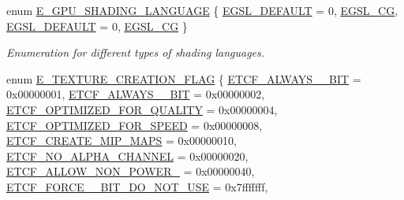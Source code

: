 \begin{DoxyCompactItemize}
\item 
enum \hyperlink{namespaceirr_1_1video_a913671e32f20f13e51336bfbe20a82a3}{E\+\_\+\+G\+P\+U\+\_\+\+S\+H\+A\+D\+I\+N\+G\+\_\+\+L\+A\+N\+G\+U\+A\+GE} \{ \hyperlink{namespaceirr_1_1video_a913671e32f20f13e51336bfbe20a82a3a3eebb0c52e3bcfee28013cfb518b4ea9}{E\+G\+S\+L\+\_\+\+D\+E\+F\+A\+U\+LT} = 0, 
\hyperlink{namespaceirr_1_1video_a913671e32f20f13e51336bfbe20a82a3a201c8a8056366df5a7f69f86ad599e01}{E\+G\+S\+L\+\_\+\+CG}, 
\hyperlink{namespaceirr_1_1video_a913671e32f20f13e51336bfbe20a82a3a3eebb0c52e3bcfee28013cfb518b4ea9}{E\+G\+S\+L\+\_\+\+D\+E\+F\+A\+U\+LT} = 0, 
\hyperlink{namespaceirr_1_1video_a913671e32f20f13e51336bfbe20a82a3a201c8a8056366df5a7f69f86ad599e01}{E\+G\+S\+L\+\_\+\+CG}
 \}\begin{DoxyCompactList}\small\item\em Enumeration for different types of shading languages. \end{DoxyCompactList}
\item 
enum \hyperlink{namespaceirr_1_1video_acaf6f7414534f7d62bff18c5bf11876f}{E\+\_\+\+T\+E\+X\+T\+U\+R\+E\+\_\+\+C\+R\+E\+A\+T\+I\+O\+N\+\_\+\+F\+L\+AG} \{ \newline
\hyperlink{namespaceirr_1_1video_acaf6f7414534f7d62bff18c5bf11876fabecb9e1d0b012d6393809a80e0041bf8}{E\+T\+C\+F\+\_\+\+A\+L\+W\+A\+Y\+S\+\_\+\_\+\+B\+IT} = 0x00000001, 
\hyperlink{namespaceirr_1_1video_acaf6f7414534f7d62bff18c5bf11876fadc16ca39b451f846d5611ac2b213620a}{E\+T\+C\+F\+\_\+\+A\+L\+W\+A\+Y\+S\+\_\+\_\+\+B\+IT} = 0x00000002, 
\hyperlink{namespaceirr_1_1video_acaf6f7414534f7d62bff18c5bf11876fa3d670628725ec4086237cbaf35b619d8}{E\+T\+C\+F\+\_\+\+O\+P\+T\+I\+M\+I\+Z\+E\+D\+\_\+\+F\+O\+R\+\_\+\+Q\+U\+A\+L\+I\+TY} = 0x00000004, 
\hyperlink{namespaceirr_1_1video_acaf6f7414534f7d62bff18c5bf11876faf43ab5c00fdf773dfeae1ed6380a662a}{E\+T\+C\+F\+\_\+\+O\+P\+T\+I\+M\+I\+Z\+E\+D\+\_\+\+F\+O\+R\+\_\+\+S\+P\+E\+ED} = 0x00000008, 
\newline
\hyperlink{namespaceirr_1_1video_acaf6f7414534f7d62bff18c5bf11876fa17c818cc743db8a0d9d991911812e4a0}{E\+T\+C\+F\+\_\+\+C\+R\+E\+A\+T\+E\+\_\+\+M\+I\+P\+\_\+\+M\+A\+PS} = 0x00000010, 
\hyperlink{namespaceirr_1_1video_acaf6f7414534f7d62bff18c5bf11876fa651fbb01805b4b9ec17f79eadfe11863}{E\+T\+C\+F\+\_\+\+N\+O\+\_\+\+A\+L\+P\+H\+A\+\_\+\+C\+H\+A\+N\+N\+EL} = 0x00000020, 
\hyperlink{namespaceirr_1_1video_acaf6f7414534f7d62bff18c5bf11876faa2ab03667e399d581bd0a612eec6c281}{E\+T\+C\+F\+\_\+\+A\+L\+L\+O\+W\+\_\+\+N\+O\+N\+\_\+\+P\+O\+W\+E\+R\+\_} = 0x00000040, 
\hyperlink{namespaceirr_1_1video_acaf6f7414534f7d62bff18c5bf11876fa38ea0c1f596277976d32ec70113443b0}{E\+T\+C\+F\+\_\+\+F\+O\+R\+C\+E\+\_\+\_\+\+B\+I\+T\+\_\+\+D\+O\+\_\+\+N\+O\+T\+\_\+\+U\+SE} = 0x7fffffff, 

\end{DoxyCompactItemize}
